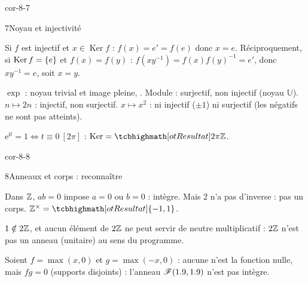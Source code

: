 \begin{blocLivre}{cor-8-7}
\begin{corrige}{7}{Noyau et injectivité}
\begin{questions}
  \item Si $f$ est injectif et $x\in\operatorname{Ker}f$ : $f(x)=e'=f(e)$
    donc $x=e$. Réciproquement, si $\operatorname{Ker}f=\left\{e\right\}$ et
    $f(x)=f(y)$ : $f(xy^{-1})=f(x)f(y)^{-1}=e'$, donc $xy^{-1}=e$, soit
    $x=y$.
  \item $\exp$ : noyau trivial et image pleine, .
    Module : surjectif, non injectif (noyau $\mathbb{U}$).
    $n\mapsto2n$ : injectif, non surjectif.
    $x\mapsto x^{2}$ : ni injectif ($\pm1$) ni surjectif (les négatifs ne
    sont pas atteints).
  \item $\mathrm{e}^{\mathrm{i}t}=1\iff t\equiv0\ [2\pi]$ :
    $\operatorname{Ker}=\res{2\pi\Z}$.
\end{questions}
\end{corrige}
\end{blocLivre}

\begin{blocLivre}{cor-8-8}
\begin{corrige}{8}{Anneaux et corps : reconnaître}
\begin{questions}
  \item Dans $\mathbb{Z}$, $ab=0$ impose $a=0$ ou $b=0$ : intègre. Mais $2$ n'a pas
    d'inverse : pas un corps. $\Z^{\times}=\res{\ens{-1,1}}$.
  \item $1\notin2\mathbb{Z}$, et aucun élément de $2\mathbb{Z}$ ne peut servir de neutre
    multiplicatif : $2\mathbb{Z}$ n'est pas un anneau (unitaire) au sens du
    programme.
  \item Soient $f=\max(x,0)$ et $g=\max(-x,0)$ : aucune n'est la fonction
    nulle, mais $fg=0$ (supports disjoints) : l'anneau
    $\mathscr{F}(1.9,1.9)$ n'est pas intègre.
\end{questions}
\end{corrige}
\end{blocLivre}

